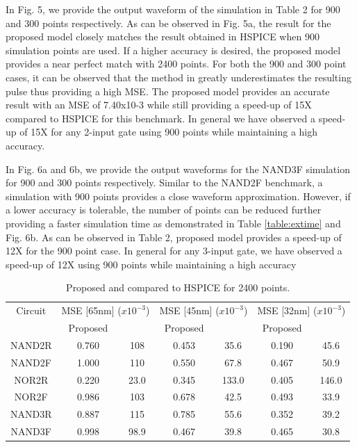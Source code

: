 In Fig. 5, we provide the output waveform of the simulation in Table 2 for 900 and 300 points respectively. As can be observed in Fig. 5a, the result for the proposed model closely matches the result obtained in HSPICE when 900 simulation points are used. If a higher accuracy is desired, the proposed model provides a near perfect match with 2400 points. For both the 900 and 300 point cases, it can be observed that the method in \cite{Accurate_Masking} greatly underestimates the resulting pulse thus providing a high MSE. The proposed model provides an accurate result with an MSE of 7.40x10-3 while still providing a speed-up of 15X compared to HSPICE for this benchmark. In general we have observed a speed-up of 15X for any 2-input gate using 900 points while maintaining a high accuracy.
  
In Fig. 6a and 6b, we provide the output waveforms for the NAND3F simulation for 900 and 300 points respectively. Similar to the NAND2F benchmark, a simulation with 900 points provides a close waveform approximation. However, if a lower accuracy is tolerable, the number of points can be reduced further providing a faster simulation time as demonstrated in Table \ref{table:extime} and Fig. 6b. As can be observed in Table 2, proposed model provides a speed-up of 12X for the 900 point case. In general for any 3-input gate, we have observed a speed-up of 12X using 900 points while maintaining a high accuracy

\begin{table}[!htbp]
	\begin{center}
		\caption{Proposed and \cite{Accurate_Masking} compared to HSPICE for 2400 points.}
		\label{table:pt}
		\begin{tabular}{|c|c|c|c|c|c|c|}
			\hline
			Circuit & \multicolumn{2}{c|}{MSE [65nm] ($x10^{-3}$)} & \multicolumn{2}{c|}{MSE [45nm] ($x10^{-3}$)} & \multicolumn{2}{c|}{MSE [32nm] ($x10^{-3}$)} \\ 
			\cline{2-7}
			& Proposed & \cite{Accurate_Masking} & Proposed & \cite{Accurate_Masking} & Proposed & \cite{Accurate_Masking}\\
			\hline
			NAND2R & 0.760 & 108 & 0.453 & 35.6 & 0.190 & 45.6 \\
			\hline
			NAND2F & 1.000 & 110 & 0.550 & 67.8 & 0.467 & 50.9 \\
			\hline
			NOR2R & 0.220 & 23.0 & 0.345 & 133.0 & 0.405 &146.0 \\
			\hline
			NOR2F & 0.986 & 103 & 0.678 & 42.5 & 0.493 & 33.9 \\
			\hline
			NAND3R & 0.887 & 115 & 0.785 & 55.6 & 0.352 & 39.2 \\
			\hline
			NAND3F & 0.998 & 98.9 & 0.467 & 39.8 & 0.465 & 30.8 \\
			\hline
		\end{tabular}
	\end{center}
\end{table}

